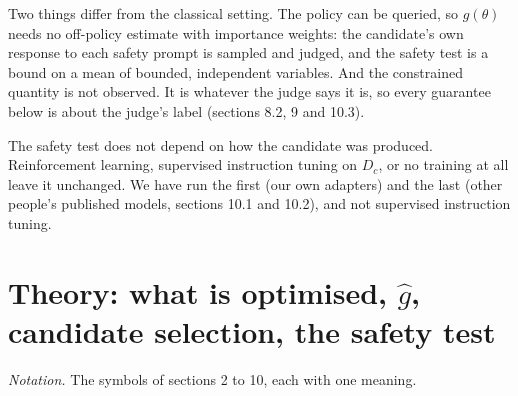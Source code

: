 \documentclass[11pt]{article}
\begin{document}
Two things differ from the classical setting. The policy can be queried, so $g (\theta )$ needs no off-policy estimate with importance weights: the candidate's own response to each safety prompt is sampled and judged, and the safety test is a bound on a mean of bounded, independent variables. And the constrained quantity is not observed. It is whatever the judge says it is, so every guarantee below is about the judge's label (sections 8.2, 9 and 10.3).


The safety test does not depend on how the candidate was produced. Reinforcement learning, supervised instruction tuning on $D_{c}$, or no training at all leave it unchanged. We have run the first (our own adapters) and the last (other people's published models, sections 10.1 and 10.2), and not supervised instruction tuning.


\section{Theory: what is optimised, \texorpdfstring{$\hat{g}$}{g-hat}, candidate selection, the safety test}

\emph{Notation.} The symbols of sections 2 to 10, each with one meaning.
\end{document}

